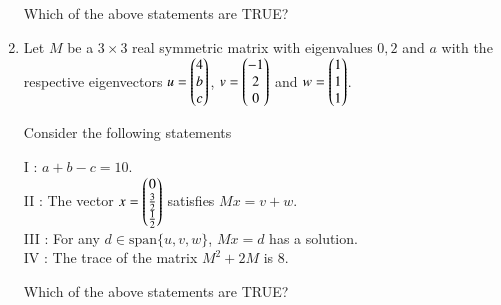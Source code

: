 \documentclass[journal,12pt,onecolumn]{IEEEtran}
\theoremstyle{remark}
\begin{document}
\begin{enumerate}[start=1, label=Q.\arabic*]

Which of the above statements are TRUE?
\begin{enumerate}
\end{enumerate}

\hfill{}


\item Let $M$ be a $3 \times 3$ real symmetric matrix with eigenvalues $0, 2$ and $a$ with the respective eigenvectors $u=\begin{pmatrix}4 \\ b \\ c\end{pmatrix}$, $v=\begin{pmatrix}-1 \\ 2 \\ 0\end{pmatrix}$ and $w=\begin{pmatrix}1 \\ 1 \\ 1\end{pmatrix}$.  

Consider the following statements\brak{:}

I : $a + b - c = 10$.\\
II : The vector $x=\begin{pmatrix}0 \\ \tfrac{3}{2} \\ \tfrac{1}{2}\end{pmatrix}$ satisfies $Mx = v + w$.\\
III : For any $d \in \text{span}\{u,v,w\}$, $Mx = d$ has a solution.\\
IV : The trace of the matrix $M^2 + 2M$ is $8$.\\

Which of the above statements are TRUE?
\begin{enumerate}
\end{enumerate}


\end{enumerate}
\end{document}
